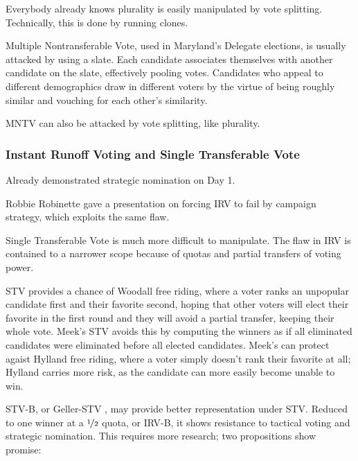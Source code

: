 Everybody already knows plurality is easily manipulated by vote splitting.  Technically, this is done by running clones.

Multiple Nontransferable Vote, used in Maryland's Delegate elections, is usually attacked by using a slate.  Each candidate associates themselves with another candidate on the slate, effectively pooling votes.  Candidates who appeal to different demographics draw in different voters by the virtue of being roughly similar and vouching for each other's similarity.

MNTV can also be attacked by vote splitting, like plurality.

\subsubsection{Instant Runoff Voting and Single Transferable Vote}

Already demonstrated strategic nomination on Day 1.

Robbie Robinette gave a presentation on forcing IRV to fail by campaign strategy, which exploits the same flaw.

Single Transferable Vote is much more difficult to manipulate.  The flaw in IRV is contained to a narrower scope because of quotas and partial transfers of voting power.

STV provides a chance of Woodall free riding, where a voter ranks an unpopular candidate first and their favorite second, hoping that other voters will elect their favorite in the first round and they will avoid a partial transfer, keeping their whole vote.  Meek's STV avoids this by computing the winners as if all eliminated candidates were eliminated before all elected candidates.  Meek's can protect agaist Hylland free riding, where a voter simply doesn't rank their favorite at all; Hylland carries more risk, as the candidate can more easily become unable to win.

STV-B, or Geller-STV \autocite{Geller2005}, may provide better representation under STV.  Reduced to one winner at a $\nicefrac{1}{2}$ quota, or IRV-B, it shows resistance to tactical voting and strategic nomination.  This requires more research; two propositions show promise:

